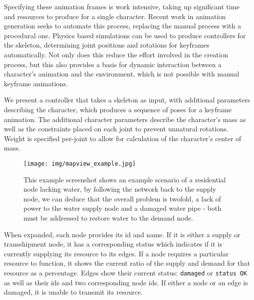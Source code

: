 Specifying these animation frames is work intensive, taking up significant time and resources to produce for a single character.  Recent work in animation generation seeks to automate this process, replacing the manual process with a procedural one.  Physics based simulations can be used to produce controllers for the skeleton, determining joint positions and rotations for keyframes automatically.  Not only does this reduce the effort involved in the creation process, but this also provides a basis for dynamic interaction between a character's animation and the environment, which is not possible with manual keyframe animations.

We present a controller that takes a skeleton as input, with additional parameters describing the character, which produces a sequence of poses for a keyframe animation.  The additional character parameters describe the character's mass as well as the constraints placed on each joint to prevent unnatural rotations.  Weight is specified per-joint to allow for calculation of the character's center of mass.



\begin{figure}[htp] \centering
    \texttt{[image: img/mapview\_example.jpg]}
    \caption[Example Infrastructure Visualization]{This example screenshot shows an example scenario of a residential node lacking water,
    by following the network back to the supply node, we can deduce that the overall problem is twofold, a lack of power
    to the water supply node and a damaged water pipe - both must be addressed to restore water to the demand node.}
    \label{fig:mapview_example}
\end{figure}

When expanded, each node provides its id and name. If it is either a supply or transshipment node, it has a
corresponding status which indicates if it is currently supplying its resource to its edges. If a node requires a particular resource to function, it shows the current ratio of the supply and demand for that resource as a percentage. Edges show their current status: {\tt damaged} or {\tt status OK} as well as their ids and two corresponding node ids. If either a node or an edge is damaged, it is unable to transmit its resource.

